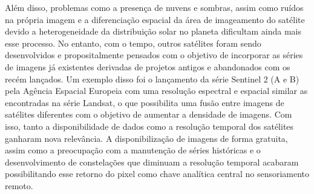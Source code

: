 \documentclass{article}
\begin{document}
\par
Além disso, problemas como a presença de nuvens e sombras, assim como ruídos na própria imagem e a diferenciação espacial da área de imageamento do satélite devido a heterogeneidade da distribuição solar no planeta dificultam ainda mais esse processo. No entanto, com o tempo, outros satélites foram sendo desenvolvidos e propositalmente pensados com o objetivo de incorporar as séries de imagens já existentes derivadas de projetos antigos e abandonados com os recém lançados. Um exemplo disso foi o lançamento da série Sentinel 2 (A e B) pela Agência Espacial Europeia com uma resolução espectral e espacial similar as encontradas na série Landsat, o que possibilita uma fusão entre imagens de satélites diferentes com o objetivo de aumentar a densidade de imagens. Com isso, tanto a disponibilidade de dados como a resolução temporal dos satélites ganharam nova relevância. A disponibilização de imagens de forma gratuita, assim como a preocupação com a manutenção de séries históricas e o desenvolvimento de constelações que diminuam a resolução temporal acabaram possibilitando esse retorno do pixel como chave analítica central no sensoriamento remoto.
\par
\end{document}
